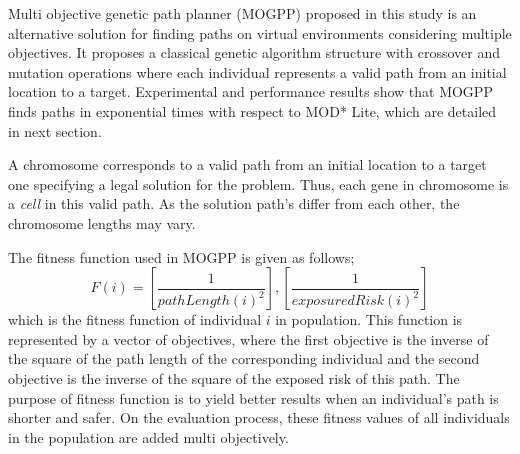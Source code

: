 \documentclass[10pt,journal]{IEEEtran}
\begin{document}

Multi objective genetic path planner (MOGPP) proposed in this study is an alternative solution for finding paths on virtual environments considering multiple objectives. It proposes a classical genetic algorithm structure with crossover and mutation operations where each individual represents a valid path from an initial location to a target. Experimental and performance results show that MOGPP finds paths in exponential times with respect to MOD* Lite, which are detailed in next section. 

A chromosome corresponds to a valid path from an initial location to a target one specifying a legal solution for the problem. Thus, each gene in chromosome is a \textit{cell} in this valid path. As the solution path's  differ from each other, the chromosome lengths may vary.

The fitness function used in MOGPP is given as follows; \[F(i) = [\dfrac{1}{pathLength(i)^{2}}], [\dfrac{1}{exposuredRisk(i)^{2}}] \] which is the fitness function of individual $i$ in population. This function is represented by a vector of objectives, where the first objective is the inverse of the square of the path length  of the corresponding individual and the second objective is the inverse of  the square of the exposed risk of this path. The purpose of fitness function is to yield better results when an individual's path is shorter and safer. On the evaluation process, these fitness values of all individuals in the population are added multi objectively.
\end{document}

